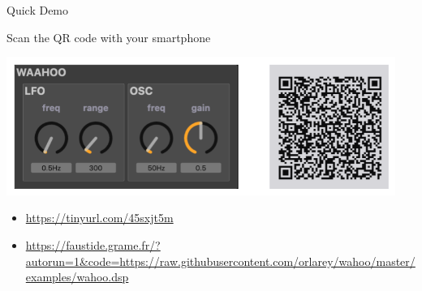 
\begin{frame}[fragile]{Quick Demo}

    Scan the QR code with your smartphone
    \begin{center}
        \includegraphics[width=0.95\textwidth]{images/wahoo.png}
    \end{center}
    \begin{itemize}
        \item \url{https://tinyurl.com/45sxjt5m}
        \item \url{https://faustide.grame.fr/?autorun=1&code=https://raw.githubusercontent.com/orlarey/wahoo/master/examples/wahoo.dsp} 
    \end{itemize}
    
\end{frame}